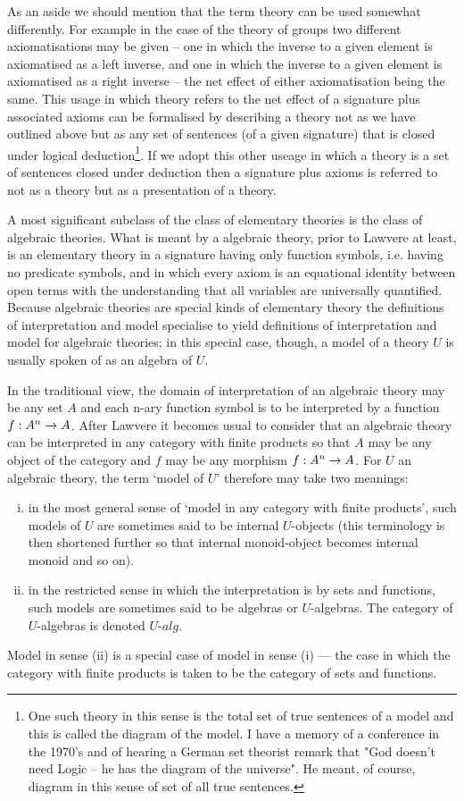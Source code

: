 As an aside we should mention that the term theory can be used somewhat differently. 
For example in the case of the theory of groups two different axiomatisations may be given 
-- one in which the inverse to a given element is axiomatised as a left inverse, and one in which the inverse to a given element is axiomatised as a right inverse --
the net effect of either axiomatisation being the same.
This usage in which  theory refers to the net effect of a signature plus associated axioms
can be formalised by describing a 
theory not as we have outlined above but as any set of sentences
 (of a given signature) that is closed under logical deduction\footnote{One such theory in this sense is the total set of true sentences of a model and  
this is called the diagram of the model. I have a  memory of a conference in the 1970's and of hearing a German set theorist
 remark that "God doesn't need Logic -- he has the diagram of the universe". He meant, of course, diagram in this sense of set of all true sentences.}. 
If we adopt this other useage in which a theory is a set of sentences closed under deduction then a signature plus axioms is referred to not as a theory but as a presentation of a theory. 

A most significant subclass of the class of elementary theories is the class of algebraic theories. 
What is meant by a algebraic theory, prior to Lawvere at least, is an elementary theory in a signature having only function symbols, 
i.e. having no predicate symbols, 
and in which every axiom is an equational identity between open terms with the understanding that
all variables are universally quantified. 
Because algebraic theories are special kinds of elementary theory the definitions of interpretation and model  specialise to yield definitions of 
interpretation and model for algebraic theories; in this special case, though, a model of a theory $U$ is usually spoken of as an algebra of $U$.

In the traditional view, the domain of interpretation of an algebraic theory may be any set $A$ 
and each n-ary function symbol is to be interpreted by a  function $f:A^n \rightarrow A$.
After Lawvere it becomes usual to consider that an algebraic theory can be interpreted in any category with finite products
 so that $A$ may be any object of the category and  $f$ may be any morphism $f:A^n \rightarrow A$. 
For $U$ an algebraic theory, the term `model of $U$' therefore may take two meanings:
\begin{enumerate}[(i)]
\item in the most general sense of `model in any category  with finite products',
 such models of $U$ are sometimes said to be internal $U$-objects (this terminology is then shortened further so that internal monoid-object becomes internal monoid and so on). 
\item in the restricted sense in which the interpretation is by sets and functions, such models are sometimes said to be algebras or
$U$-algebras. The category of $U$-algebras is denoted $U$-$alg$. 
\end{enumerate} 
Model in sense (ii) is a special case of model in sense (i) ---  the case in which the category with finite products is taken to be the category of sets and functions.

